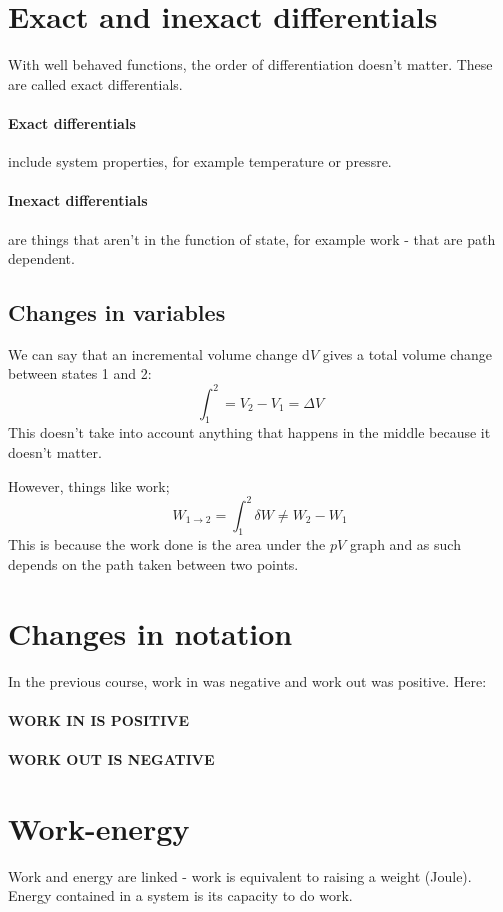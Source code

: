 \section{Exact and inexact differentials}
With well behaved functions, the order of differentiation doesn't matter. These
are called exact differentials.
\paragraph{Exact differentials} include system properties, for example
temperature or pressre.
\paragraph{Inexact differentials} are things that aren't in the function of
state, for example work - that are path dependent.

\subsection{Changes in variables}
We can say that an incremental volume change d$V$ gives a total volume change
between states 1 and 2:
$$
	\int^2_1 = V_2 - V_1 = \Delta V
$$
This doesn't take into account anything that happens in the middle because it
doesn't matter.

However, things like work;
$$
	W_{1\rightarrow 2} = \int^2_1 \delta W \neq W_2 - W_1
$$
This is because the work done is the area under the $pV$ graph and as such
depends on the path taken between two points.

\section{Changes in notation}
In the previous course, work in was negative and work out was positive. Here:
\paragraph{WORK IN IS POSITIVE}
\paragraph{WORK OUT IS NEGATIVE}

\section{Work-energy}
Work and energy are linked - work is equivalent to raising a weight (Joule).
Energy contained in a system is its capacity to do work.

